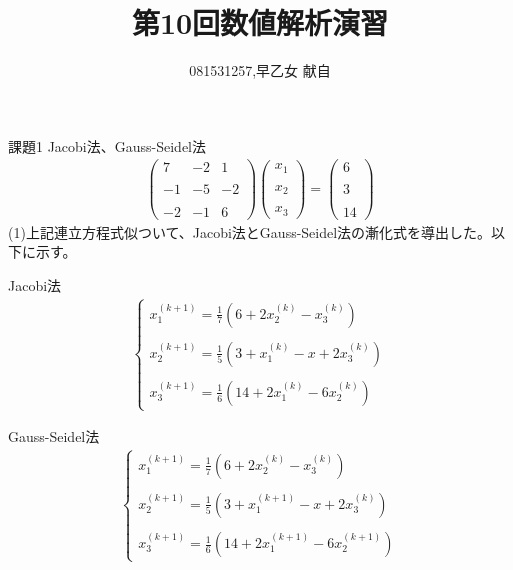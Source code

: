 \documentclass[]{jsarticle}
\title{第10回数値解析演習}
\author{081531257,早乙女 献自}
\date{}
\begin{document}
\maketitle
課題1 Jacobi法、Gauss-Seidel法
\begin{eqnarray}
\left(
\begin{array}{rrr}
  7&-2&1\\
  　&　&　\\
  -1&-5&-2\\
  　&　&　\\
  -2&-1&6
\end{array}
\right)
\left(
\begin{array}{r}
  x_1\\\\x_2\\\\x_3
\end{array}
\right)
 = 
\left(
\begin{array}{r}
  6\\\\3\\\\14
\end{array}
\right)
\nonumber
\end{eqnarray}
\noindent
(1)上記連立方程式似ついて、Jacobi法とGauss-Seidel法の漸化式を導出した。以下に示す。

Jacobi法
\begin{eqnarray}
\left\{
\begin{array}{c}
x_1^{(k+1)}=\frac{1}{7}(6+2x_2^{(k)}-x_3^{(k)})\\\\
x_2^{(k+1)}=\frac{1}{5}(3+x_1^{(k)}-x+2x_3^{(k)})\\\\
x_3^{(k+1)}=\frac{1}{6}(14+2x_1^{(k)}-6x_2^{(k)})
\end{array}
\right.
\nonumber
\end{eqnarray}

Gauss-Seidel法
\begin{eqnarray}
\left\{
\begin{array}{c}
x_1^{(k+1)}=\frac{1}{7}(6+2x_2^{(k)}-x_3^{(k)})\\\\
x_2^{(k+1)}=\frac{1}{5}(3+x_1^{(k+1)}-x+2x_3^{(k)})\\\\
x_3^{(k+1)}=\frac{1}{6}(14+2x_1^{(k+1)}-6x_2^{(k+1)})
\end{array}
\right.
\nonumber
\end{eqnarray}
\end{document}
